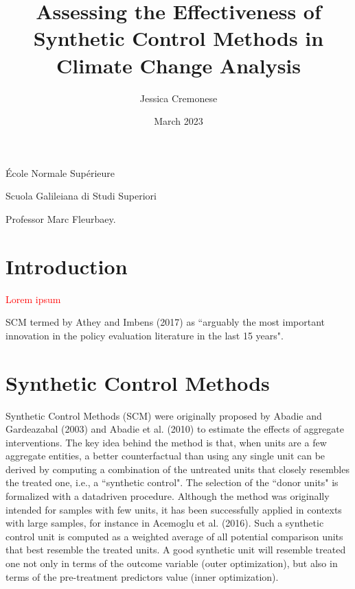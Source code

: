 \documentclass[12pt,a4paper,draft]{article}
\begin{document}
\begin{titlepage}
\title{Assessing the Effectiveness of Synthetic Control Methods in Climate Change Analysis}
\author{Jessica Cremonese}
\date{March 2023}
\maketitle

\vspace{2cm}

\begin{center}
    École Normale Supérieure
\end{center}

\begin{center}
    Scuola Galileiana di Studi Superiori
\end{center}

\vspace{7cm}
Professor Marc Fleurbaey.


\end{titlepage}

\tableofcontents


\newpage


\section{Introduction} %

\textcolor{red}{Lorem ipsum}

SCM termed by Athey and Imbens (2017) as ``arguably the most important innovation in the 
policy evaluation literature in the last 15 years".



\section{Synthetic Control Methods}  %

Synthetic Control Methods (SCM) were originally proposed by Abadie and Gardeazabal 
(2003) and Abadie et al. (2010) to estimate the effects of aggregate interventions.
The key idea behind the method is that, when units are a few aggregate entities, 
a better counterfactual than using any single unit can be derived by computing a 
combination of the untreated units that closely resembles the treated one, i.e., 
a ``synthetic control". 
The selection of the ``donor units" is formalized with a datadriven procedure.
Although the method was originally intended for samples with few units, it has been 
successfully applied in contexts with large samples, for instance in Acemoglu et 
al. (2016).
Such a synthetic control unit is computed as a weighted average of all potential 
comparison units that best resemble the treated units. A good synthetic unit will 
resemble treated one not only in terms of the outcome variable (outer optimization), 
but also in terms of the pre-treatment predictors value (inner optimization).
\end{document}

